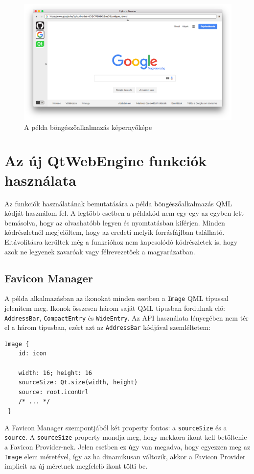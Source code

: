 \documentclass[12pt]{report}
\begin{document}
\begin{figure}[H]
    \centering
    \includegraphics[scale=0.34]{diplomabrowser}
    \caption{
        \label{fig:diplomabrowser}
        A példa böngészőalkalmazás képernyőképe
    }
\end{figure}

\newpage
\section{Az új QtWebEngine funkciók használata}

Az funkciók használatának bemutatására a példa böngészőalkalmazás QML kódját használom fel.
A legtöbb esetben a példakód nem egy-egy az egyben lett bemásolva, hogy az olvashatóbb
legyen és nyomtatásban kiférjen. Minden kódrészletnél megjelöltem, hogy az eredeti
melyik forrásfájlban található. Eltávolításra kerültek még a funkcióhoz nem kapcsolódó
kódrészletek is, hogy azok ne legyenek zavaróak vagy félrevezetőek a magyarázatban.

\subsection{Favicon Manager}

A példa alkalmazásban az ikonokat minden esetben a \texttt{Image} QML típussal jelenítem meg.
Ikonok összesen három saját QML típusban fordulnak elő: \texttt{AddressBar},
\texttt{CompactEntry} és \texttt{WideEntry}. Az API használata lényegében nem tér el a három
típusban, ezért azt az \texttt{AddressBar} kódjával szemléltetem:
\begin{lstlisting}[title=AddressBar.qml]
 Image {
    id: icon

    width: 16; height: 16
    sourceSize: Qt.size(width, height)
    source: root.iconUrl
    /* ... */
 }
\end{lstlisting}
A Favicon Manager szempontjából két property fontos: a \texttt{sourceSize} és a
\texttt{source}. A \texttt{sourceSize} property mondja meg, hogy mekkora ikont kell
betöltenie a Favicon Provider-nek. Jelen esetben ez úgy van megadva, hogy egyezzen meg az
\texttt{Image} elem méretével, így az ha dinamikusan változik, akkor a Favicon Provider
implicit az új méretnek megfelelő ikont tölti be.
\end{document}
